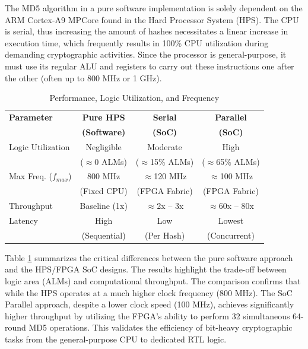 \documentclass[conference]{IEEEtran}
\begin{document}
The MD5 algorithm in a pure software implementation is solely dependent on the ARM Cortex-A9 MPCore found in the Hard Processor System (HPS). The CPU is serial, thus increasing the amount of hashes necessitates a linear increase in execution time, which frequently results in 100\% CPU utilization during demanding cryptographic activities. Since the processor is general-purpose, it must use its regular ALU and registers to carry out these instructions one after the other (often up to 800 MHz or 1 GHz). 

\begin{table}[htbp]
\caption{Performance, Logic Utilization, and Frequency}
\begin{center}
\begin{tabular}{|l|c|c|c|}
\hline
\textbf{Parameter} & \textbf{Pure HPS} & \textbf{Serial} & \textbf{Parallel} \\
 & \textbf{(Software)} & \textbf{(SoC)} & \textbf{(SoC)} \\
\hline
Logic Utilization & Negligible & Moderate & High \\
 & ($\approx$0 ALMs) & ($\approx$15\% ALMs) & ($\approx$65\% ALMs) \\
\hline
Max Freq. ($f_{max}$) & 800 MHz & $\approx$120 MHz & $\approx$100 MHz \\
 & (Fixed CPU) & (FPGA Fabric) & (FPGA Fabric) \\
\hline
Throughput & Baseline (1x) & $\approx$2x -- 3x & $\approx$60x -- 80x \\
\hline
Latency & High  & Low  & Lowest \\
 & (Sequential) & (Per Hash) & (Concurrent) \\
\hline
\end{tabular}
\label{tab:comparison}
\end{center}
\end{table}

Table \ref{tab:comparison} summarizes the critical differences between the pure software approach and the HPS/FPGA SoC designs. The results highlight the trade-off between logic area (ALMs) and computational throughput. The comparison confirms that while the HPS operates at a much higher clock frequency (800 MHz). The SoC Parallel approach, despite a lower clock speed (100 MHz), achieves significantly higher throughput by utilizing the FPGA's ability to perform 32 simultaneous 64-round MD5 operations. This validates the efficiency of bit-heavy cryptographic tasks from the general-purpose CPU to dedicated RTL logic.
\end{document}
